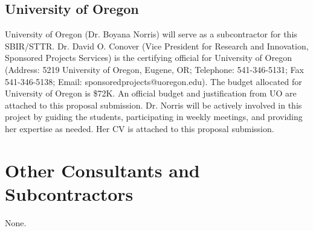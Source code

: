
\subsection{University of Oregon}


University of Oregon (Dr. Boyana Norris) will serve as a subcontractor for this SBIR/STTR.
Dr. David O. Conover (Vice President for Research and Innovation, Sponsored Projects Services) is the
certifying official for University of Oregon (Address: 5219 University of Oregon, Eugene, OR;
Telephone: 541-346-5131; Fax 541-346-5138; Email: sponsoredprojects@uoregon.edu). The budget allocated
for University of Oregon is \$72K. An official budget and justification from UO are attached to
this proposal submission. Dr. Norris will be actively involved in this project by guiding the students,
participating in weekly meetings, and providing her expertise as needed. Her CV is attached to this
proposal submission.

\section{Other Consultants and Subcontractors}
None.
